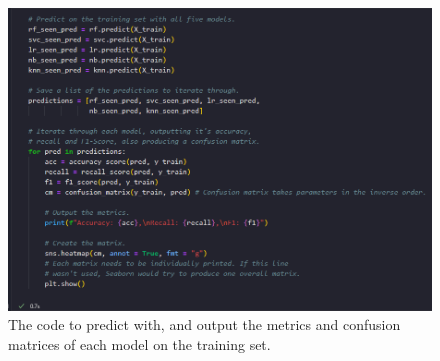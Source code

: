 \documentclass[12pt]{report}
\begin{document}
\begin{figure}[H]
    \centering 
    \includegraphics[width=\linewidth]{ModelDev/Iteration1/Code/Seen/Matrices.png}
    \caption{The code to predict with, and output the metrics and confusion matrices of each model on the training set.}
    \label{fig:SeenDataCode}
\end{figure}
\end{document}
